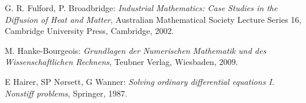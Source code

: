 \documentclass[
]{mycourse}
\theoremstyle{mythm}
\theoremstyle{break}
\begin{document}
\begin{thebibliography}{100}

G. R. Fulford, P. Broadbridge: \emph{Industrial Mathematics: Case Studies in the Diffusion of Heat and Matter}, 
Australian Mathematical Society Lecture Series 16, Cambridge University Press, Cambridge, 2002.

M. Hanke-Bourgeois: \emph{Grundlagen der Numerischen Mathematik und des Wissenschaftlichen Rechnens}, Teubner Verlag, Wiesbaden, 2009. 

E Hairer, SP N{\o}rsett, G Wanner: 
\emph{Solving ordinary differential equations I. Nonstiff problems},
Springer, 1987.








\end{thebibliography}
\end{document}
